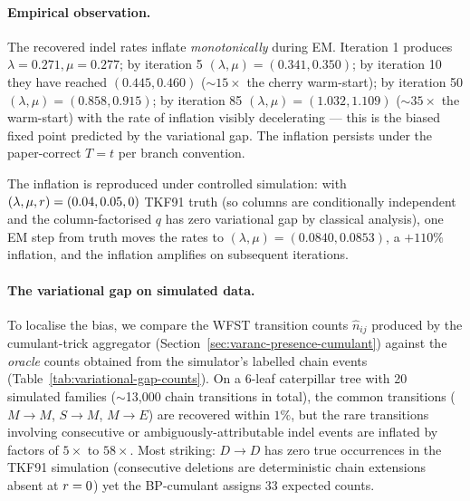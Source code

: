 \paragraph{Empirical observation.}
The recovered indel rates inflate \emph{monotonically} during EM.
Iteration 1 produces $\lambda=0.271, \mu=0.277$; by iteration 5
$(\lambda, \mu) = (0.341, 0.350)$; by iteration 10 they have reached
$(0.445, 0.460)$ ($\sim 15\times$ the cherry warm-start);
by iteration 50 $(\lambda, \mu) = (0.858, 0.915)$;
by iteration 85 $(\lambda, \mu) = (1.032, 1.109)$ ($\sim 35\times$
the warm-start) with the rate of inflation visibly decelerating ---
this is the biased fixed point predicted by the variational gap.
The inflation persists under the paper-correct $T=t$ per branch
convention.

The inflation is reproduced under controlled simulation: with
$(\lambda, \mu, r) = (0.04, 0.05, 0)$ TKF91 truth (so columns
are conditionally independent and the column-factorised $q$ has zero
variational gap by classical analysis), one EM step from truth
moves the rates to $(\lambda, \mu) = (0.0840, 0.0853)$, a $+110\%$
inflation, and the inflation amplifies on subsequent iterations.

\paragraph{The variational gap on simulated data.}
To localise the bias, we compare the WFST transition counts
$\hat n_{ij}$ produced by the cumulant-trick aggregator
(Section~\ref{sec:varanc-presence-cumulant}) against the
\emph{oracle} counts obtained from the simulator's labelled chain
events (Table~\ref{tab:variational-gap-counts}).
On a 6-leaf caterpillar tree with 20 simulated families
($\sim$13{,}000 chain transitions in total), the common transitions
($M\to M$, $S\to M$, $M\to E$) are recovered within $1\%$, but the
rare transitions involving consecutive or ambiguously-attributable
indel events are inflated by factors of $5\times$ to $58\times$.
Most striking: $D\to D$ has zero true occurrences in the TKF91
simulation (consecutive deletions are deterministic chain extensions
absent at $r=0$) yet the BP-cumulant assigns 33 expected counts.

